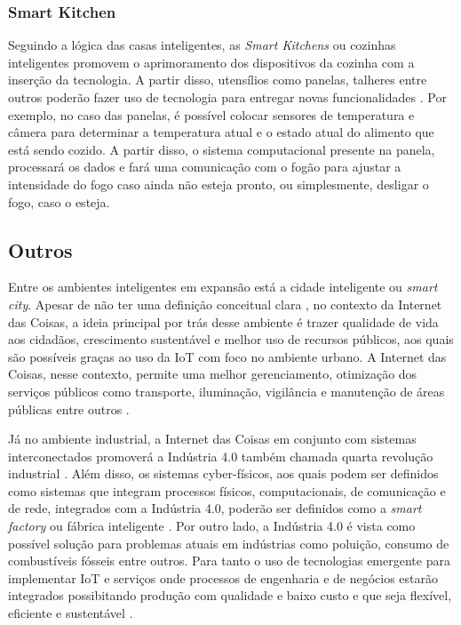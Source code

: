 \subsubsection{Smart Kitchen}

Seguindo a lógica das casas inteligentes, as \textit{Smart Kitchens} ou cozinhas inteligentes promovem o aprimoramento dos dispositivos da cozinha com a inserção da tecnologia. A partir disso, utensílios como panelas, talheres entre outros poderão fazer uso de tecnologia para entregar novas funcionalidades \cite{Staender2012}. Por exemplo, no caso das panelas, é possível colocar sensores de temperatura e câmera para determinar a temperatura atual e o estado atual do alimento que está sendo cozido. A partir disso, o sistema computacional presente na panela, processará os dados e fará uma comunicação com o fogão para ajustar a intensidade do fogo caso ainda não esteja pronto, ou simplesmente, desligar o fogo, caso o esteja. 

\subsection{Outros}





Entre os ambientes inteligentes em expansão está a cidade inteligente ou \textit{smart city}. Apesar de não ter uma definição conceitual clara \cite{Cocchia2014}, no contexto da Internet das Coisas, a ideia principal por trás desse ambiente é trazer qualidade de vida aos cidadãos, crescimento sustentável e melhor uso de recursos públicos, aos quais são possíveis graças ao uso da IoT com foco no ambiente urbano. A Internet das Coisas, nesse contexto, permite uma melhor gerenciamento, otimização dos serviços públicos como transporte, iluminação, vigilância e manutenção de áreas públicas entre outros  \cite{Zanella2014}. 

%
Já no ambiente industrial, a Internet das Coisas em conjunto com sistemas interconectados promoverá a Indústria 4.0 também chamada quarta revolução industrial . Além disso, os sistemas cyber-físicos, aos quais podem ser definidos como sistemas que integram processos físicos, computacionais, de comunicação e de rede, integrados com a Indústria 4.0, poderão ser definidos como a \textit{smart factory} ou fábrica inteligente \cite{Lee2015}. Por outro lado, a Indústria 4.0 é vista como possível solução para problemas atuais em indústrias como poluição, consumo de combustíveis fósseis entre outros. Para tanto o uso de tecnologias emergente para implementar IoT e serviços onde processos de engenharia e de negócios estarão integrados possibitando produção com qualidade e baixo custo e que seja flexível, eficiente e sustentável \cite{Hussain2016}.


